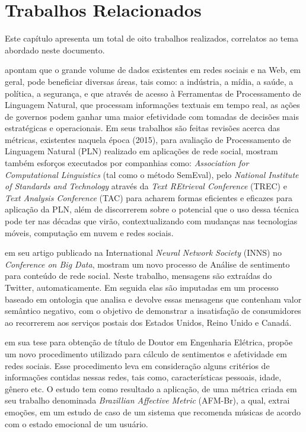 \chapter{Trabalhos Relacionados}

Este capítulo apresenta um total de oito trabalhos realizados, correlatos ao tema abordado neste documento. 

\cite{Farzindar:15} apontam que o grande volume de dados existentes em redes sociais e na Web, em geral, pode beneficiar diversas áreas, tais como: a indústria, a mídia, a saúde, a política, a segurança, e que através de acesso à Ferramentas de Processamento  de Linguagem Natural, que processam informações textuais em tempo real, as ações de governos podem ganhar uma maior efetividade com tomadas de decisões mais estratégicas e operacionais. 
Em seus trabalhos são feitas revisões acerca das métricas, existentes naquela época (2015), para avaliação de Processamento de Linguagem Natural (PLN) realizado em aplicações de rede social, mostram também esforços executados por companhias como: \textit{Association for Computational Linguistics} (tal como o método SemEval), pelo  \textit{National Institute of Standards and Technology} através da \textit{Text REtrieval Conference} (TREC) e \textit{Text Analysis Conference} (TAC) para acharem formas eficientes e eficazes para aplicação da PLN, além de discorrerem sobre o potencial que o uso dessa técnica pode ter nas décadas que virão, contextualizando com mudanças nas tecnologias móveis, computação em nuvem e redes sociais.

\cite{ThakoreSasi:15} em seu artigo publicado na International \textit{Neural Network Society} (INNS)  no \textit{Conference on Big Data}, mostram um novo processo de Análise de sentimento para conteúdo de rede social.
Neste trabalho, mensagens são extraídas do Twitter, automaticamente. Em seguida elas são imputadas em um processo baseado em ontologia que analisa e devolve essas mensagens que contenham valor semântico negativo, com o objetivo de demonstrar a insatisfação de consumidores ao recorrerem aos serviços postais dos Estados Unidos, Reino Unido e Canadá.

\cite{Rosa:15} em sua tese para obtenção de título de Doutor em Engenharia Elétrica, propõe um novo procedimento utilizado para cálculo de sentimentos e afetividade em redes sociais. Esse procedimento leva em consideração alguns critérios de informações contidas nessas redes, tais como,  características pessoais, idade, gênero etc.
O estudo tem como resultado a aplicação, de uma métrica criada em seu trabalho denominada  \textit{Brazillian Affective Metric} (AFM-Br), a qual, extrai emoções, em um estudo de caso de um sistema que recomenda músicas de acordo com o estado emocional de um usuário. 


